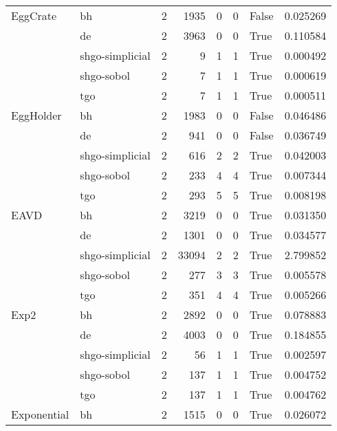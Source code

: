 \begin{longtable}{llrrrrlr}
EggCrate & bh &     2 &     1935 &      0 &       0 &   False &    0.025269 \\
         & de &     2 &     3963 &      0 &       0 &    True &    0.110584 \\
         & shgo-simplicial &     2 &        9 &      1 &       1 &    True &    0.000492 \\
         & shgo-sobol &     2 &        7 &      1 &       1 &    True &    0.000619 \\
         & tgo &     2 &        7 &      1 &       1 &    True &    0.000511 \\
EggHolder & bh &     2 &     1983 &      0 &       0 &   False &    0.046486 \\
         & de &     2 &      941 &      0 &       0 &   False &    0.036749 \\
         & shgo-simplicial &     2 &      616 &      2 &       2 &    True &    0.042003 \\
         & shgo-sobol &     2 &      233 &      4 &       4 &    True &    0.007344 \\
         & tgo &     2 &      293 &      5 &       5 &    True &    0.008198 \\
EAVD & bh &     2 &     3219 &      0 &       0 &    True &    0.031350 \\
         & de &     2 &     1301 &      0 &       0 &    True &    0.034577 \\
         & shgo-simplicial &     2 &    33094 &      2 &       2 &    True &    2.799852 \\
         & shgo-sobol &     2 &      277 &      3 &       3 &    True &    0.005578 \\
         & tgo &     2 &      351 &      4 &       4 &    True &    0.005266 \\
Exp2 & bh &     2 &     2892 &      0 &       0 &    True &    0.078883 \\
         & de &     2 &     4003 &      0 &       0 &    True &    0.184855 \\
         & shgo-simplicial &     2 &       56 &      1 &       1 &    True &    0.002597 \\
         & shgo-sobol &     2 &      137 &      1 &       1 &    True &    0.004752 \\
         & tgo &     2 &      137 &      1 &       1 &    True &    0.004762 \\
Exponential & bh &     2 &     1515 &      0 &       0 &    True &    0.026072 \\

\end{longtable}
